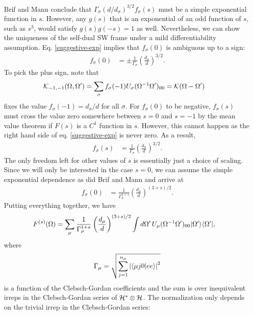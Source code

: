 Brif and Mann conclude that $ \Gamma_{\sigma} (d/d_{\sigma})^{3/2} f_{\sigma}(s)$ must be a simple exponential function in $s$. However, any $g(s)$ that is an exponential of an odd function of $s$, such as $s^3$, would satisfy $g(s)g(-s) = 1$ as well. Nevertheless, we can show the uniqueness of the self-dual SW frame under a mild differentiability assumption. Eq. \eqref{suggestive-exp} implies that $f_{\sigma}(0)$ is ambiguous up to a sign:
\begin{align}
	f_{\sigma}(0) &= \pm \frac{1}{\Gamma_{\sigma}} \left( \frac{d_{\sigma}}{d} \right)^{3/2}.
\end{align}
To pick the plus sign, note that
\begin{align}
	\mathcal{K}_{-1,-1}(\Omega,\Omega') &= \sum_{\sigma} f_{\sigma}(-1) U_{\sigma}(\Omega^{-1}\Omega')_{00} = \mathcal{K}(\Omega - \Omega')
\end{align}
fixes the value $f_{\sigma}(-1) = d_{\sigma}/d$ for all $\sigma$. For $f_{\sigma}(0)$ to be negative, $f_{\sigma}(s)$ must cross the value zero somewhere between $s=0$ and $s=-1$ by the mean value theorem if $F(s)$ is a $C^1$ function in $s$. However, this cannot happen as the right hand side of eq. \eqref{suggestive-exp} is never zero. As a result,
\begin{align}
	f_{\sigma}(s) &= \frac{1}{\Gamma_{\sigma}} \left( \frac{d_{\sigma}}{d} \right)^{3/2}.
\end{align}
The only freedom left for other values of $s$ is essentially just a choice of scaling. Since we will only be interested in the case $s=0$, we can assume the simple exponential dependence as did Brif and Mann and arrive at
\begin{align}
f_{\sigma}(0) &= \frac{1}{\Gamma_{\sigma}^{1+s}} \left( \frac{d_{\sigma}}{d} \right)^{(3+s)/2}.
\end{align}
Putting everything together, we have
\begin{align}\label{brif-mann-frame}
F^{(s)}(\Omega) &= \sum_{\mu} \frac{1}{\Gamma_{\mu}^{1+s}} \left( \frac{d_{\mu}}{d} \right)^{(3+s)/2}
\int d\Omega'\,\rep_{\mu}(\Omega^{-1}\Omega')_{00} \ketbra{\Omega'}{\Omega'},
\end{align}
where
\begin{align}\label{brif-mann-cg}
	\Gamma_{\mu} = \sqrt{ \sum_{j=1}^{n_{\mu}} \left| \braket{\mu j 0|ee} \right|^2}
\end{align}
is a function of the Clebsch-Gordan coefficients and the sum is over inequivalent irreps in the Clebsch-Gordan series of $\mathcal{H}^* \otimes \mathcal{H}$. The normalization only depends on the trivial irrep in the Clebsch-Gordan series:
